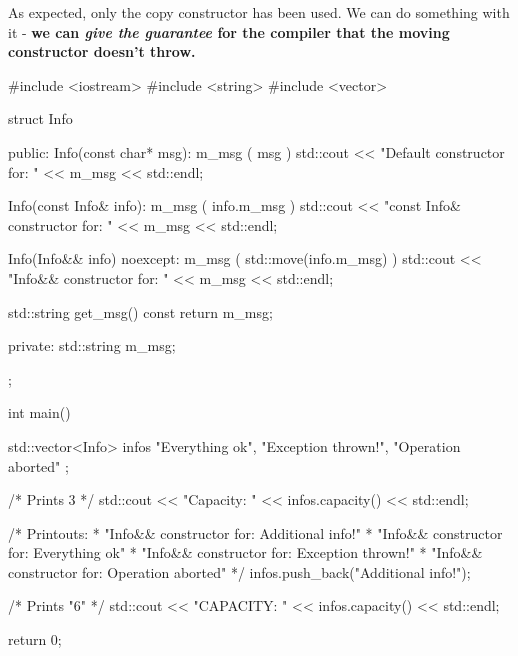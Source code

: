 \documentclass[../main]{subfiles}
\begin{document}
\noindent
As expected, only the copy constructor has been used.
We can do something with it - \textbf{we can
\textit{give the guarantee} for the compiler that the moving
constructor doesn't throw.}
\begin{Code}
    #include <iostream>
    #include <string>
    #include <vector>
    
    struct Info
    {
    public:
        Info(const char* msg): m_msg ( msg )
        {
            std::cout << "Default constructor for: "
                      << m_msg << std::endl;
        }
    
        Info(const Info& info): m_msg ( info.m_msg )
        {
            std::cout << "const Info& constructor for: "
                      << m_msg << std::endl;
        }
    
        Info(Info&& info) noexcept:
            m_msg ( std::move(info.m_msg) )
        {
            std::cout << "Info&& constructor for: "
                      << m_msg << std::endl;
        }
    
        std::string get_msg() const
        {
            return m_msg;
        }
    
    private:
        std::string m_msg;
    };
    
    int main()
    {
        std::vector<Info> infos
        {
            "Everything ok",
            "Exception thrown!",
            "Operation aborted"
        };
        
        /* Prints 3 */
        std::cout << "Capacity: " << infos.capacity() << std::endl;
    
        /* Printouts:
         * "Info&& constructor for: Additional info!"
         * "Info&& constructor for: Everything ok"
         * "Info&& constructor for: Exception thrown!"
         * "Info&& constructor for: Operation aborted"
         */
        infos.push_back("Additional info!");
        
        /* Prints "6" */
        std::cout << "CAPACITY: " << infos.capacity() << std::endl;
    
        return 0;
    }
\end{Code}
\end{document}
